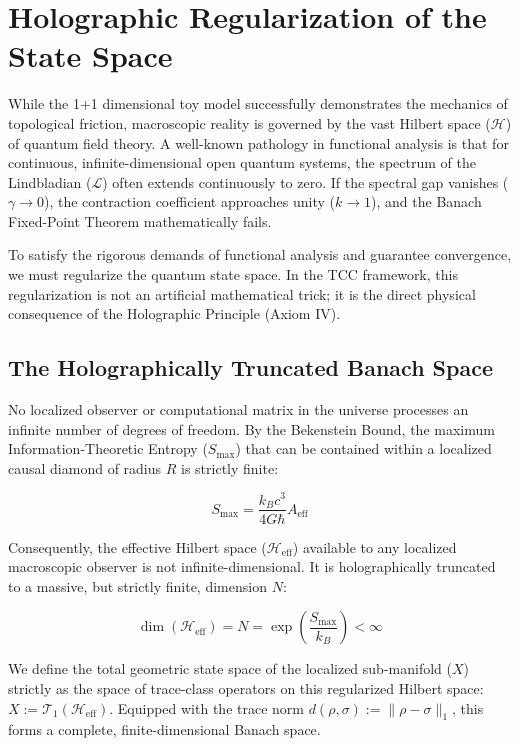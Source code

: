 \documentclass[12pt,openany]{book}
\theoremstyle{plain}
\theoremstyle{definition}
\theoremstyle{remark}
\begin{document}
\section{Holographic Regularization of the State Space}

While the 1+1 dimensional toy model successfully demonstrates the mechanics of topological friction, macroscopic reality is governed by the vast Hilbert space ($\mathcal{H}$) of quantum field theory. A well-known pathology in functional analysis is that for continuous, infinite-dimensional open quantum systems, the spectrum of the Lindbladian ($\mathcal{L}$) often extends continuously to zero. If the spectral gap vanishes ($\gamma \to 0$), the contraction coefficient approaches unity ($k \to 1$), and the Banach Fixed-Point Theorem mathematically fails.

To satisfy the rigorous demands of functional analysis and guarantee convergence, we must regularize the quantum state space. In the TCC framework, this regularization is not an artificial mathematical trick; it is the direct physical consequence of the Holographic Principle (Axiom IV).

\subsection{The Holographically Truncated Banach Space}

No localized observer or computational matrix in the universe processes an infinite number of degrees of freedom. By the Bekenstein Bound, the maximum Information-Theoretic Entropy ($S_{\text{max}}$) that can be contained within a localized causal diamond of radius $R$ is strictly finite:

\begin{equation}
S_{\text{max}} = \frac{k_B c^3}{4G\hbar} A_{\text{eff}}
\end{equation}

Consequently, the effective Hilbert space ($\mathcal{H}_{\text{eff}}$) available to any localized macroscopic observer is not infinite-dimensional. It is holographically truncated to a massive, but strictly finite, dimension $N$:

\begin{equation}
\dim(\mathcal{H}_{\text{eff}}) = N = \exp\left( \frac{S_{\text{max}}}{k_B} \right) < \infty
\end{equation}

We define the total geometric state space of the localized sub-manifold ($X$) strictly as the space of trace-class operators on this regularized Hilbert space: $X := \mathcal{T}_1(\mathcal{H}_{\text{eff}})$. Equipped with the trace norm $d(\rho, \sigma) := \|\rho - \sigma\|_1$, this forms a complete, finite-dimensional Banach space.
\end{document}
